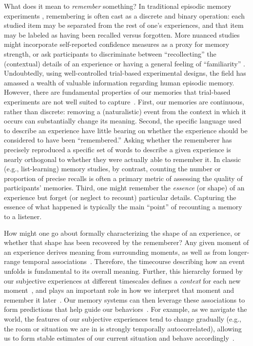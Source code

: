 \documentclass{article}
\begin{document}
What does it mean to \textit{remember} something? In traditional episodic memory experiments \citep[e.g., list-learning or trial-based experiments;][]{Murd62a, Kaha96}, remembering is often cast as a discrete and binary operation: each studied item may be separated from the rest of one's experiences, and that item may be labeled as having been recalled versus forgotten. More nuanced studies might incorporate self-reported confidence measures as a proxy for memory strength, or ask participants to discriminate between ``recollecting'' the (contextual) details of an experience or having a general feeling of ``familiarity'' \citep{Yone02}. Undoubtedly, using well-controlled trial-based experimental designs, the field has amassed a wealth of valuable information regarding human episodic memory.  However, there are fundamental properties of our memories that trial-based experiments are not well suited to capture~\citep[for review also see][]{KoriGold94, HukEtal18}.  First, our memories are continuous, rather than discrete: removing a (naturalistic) event from the context in which it occurs can substantially change its meaning.  Second, the specific language used to describe an experience have little bearing on whether the experience should be considered to have been ``remembered.''  Asking whether the rememberer has precisely reproduced a specific set of words to describe a given experience is nearly orthogonal to whether they were actually able to remember it.  In classic (e.g., list-learning) memory studies, by contrast, counting the number or proportion of precise recalls is often a primary metric of assessing the quality of participants' memories.  Third, one might remember the \textit{essence} (or shape) of an experience but forget (or neglect to recount) particular details.  Capturing the essence of what happened is typically the main ``point'' of recounting a memory to a listener.

How might one go about formally characterizing the shape of an experience, or whether that shape has been recovered by the rememberer?  Any given moment of an experience derives meaning from surrounding moments, as well as from longer-range temporal associations~\citep[e.g., ][]{LernEtal11}.  Therefore, the timecourse describing how an event unfolds is fundamental to its overall meaning.  Further, this hierarchy formed by our subjective experiences at different timescales defines a \textit{context} for each new moment~\citep[e.g., ][]{HowaKaha02a, HowaEtal14}, and plays an important role in how we interpret that moment and remember it later~\citep[for review see][]{MannEtal15}.  Our memory systems can then leverage these associations to form predictions that help guide our behaviors~\citep{RangRitc12}.  For example, as we navigate the world, the features of our subjective experiences tend to change gradually (e.g., the room or situation we are in is strongly temporally autocorrelated), allowing us to form stable estimates of our current situation and behave accordingly~\citep{ZackEtal07, ZwaaRadv98}.  
\end{document}
